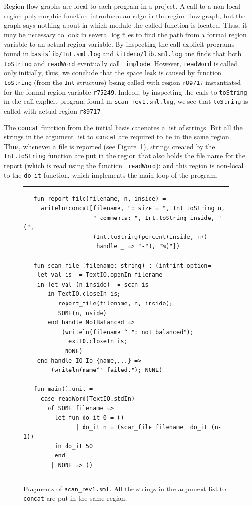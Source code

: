 \documentclass[12pt]{book}
\begin{document}
Region flow graphs are local to each program in a project. A call to a
non-local region-polymorphic function introduces an edge in the region
flow graph, but the graph says nothing about in which module the
called function is located. Thus, it may be necessary to look in
several log files to find the path from a formal region variable to an
actual region variable. By inspecting the call-explicit programs found
in {\tt basislib/Int.sml.log} and {\tt kitdemo/lib.sml.log} one finds
that both {\tt toString} and {\tt readWord} eventually call {\tt
  implode}. However, {\tt readWord} is called only initially, thus, we
conclude that the space leak is caused by function {\tt toString}
(from the {\tt Int} structure) being called with region {\tt r89717}
instantiated for the formal region variable {\tt r75249}. Indeed, by
inspecting the calls to {\tt toString} in the call-explicit program
found in {\tt scan\_rev1.sml.log}, we see that {\tt toString} is called
with actual region {\tt r89717}. 

The {\tt concat} function from the initial basis catenates a list of
strings. But all the strings in the argument list to {\tt concat} are
required to be in the same region. Thus, whenever a file is reported
(see Figure~\ref{report_file.fig}), strings created by the {\tt
  Int.toString} function are put in the region that also holds the
file name for the report (which is read using the function {\tt
  readWord}); and this region is non-local to the {\tt do\_it}
function, which implements the main loop of the program.
\begin{figure}
\hrule \medskip
\begin{verbatim}
   fun report_file(filename, n, inside) = 
     writeln(concat[filename, ": size = ", Int.toString n, 
                    " comments: ", Int.toString inside, " (",
                    (Int.toString(percent(inside, n)) 
                     handle _ => "-"), "%)"])

   fun scan_file (filename: string) : (int*int)option=
    let val is  = TextIO.openIn filename 
    in let val (n,inside)  = scan is
       in TextIO.closeIn is; 
          report_file(filename, n, inside);
          SOME(n,inside)
       end handle NotBalanced => 
           (writeln(filename ^ ": not balanced");
            TextIO.closeIn is;
            NONE)
    end handle IO.Io {name,...} => 
        (writeln(name^" failed."); NONE)

   fun main():unit =
     case readWord(TextIO.stdIn)
       of SOME filename =>
         let fun do_it 0 = ()
               | do_it n = (scan_file filename; do_it (n-1))
         in do_it 50
         end
        | NONE => ()
\end{verbatim}
\caption{Fragments of {\tt scan\_rev1.sml}. All the strings in the 
  argument list to {\tt concat} are put in the same region.}
\label{report_file.fig}
\medskip \hrule
\end{figure}
\end{document}
